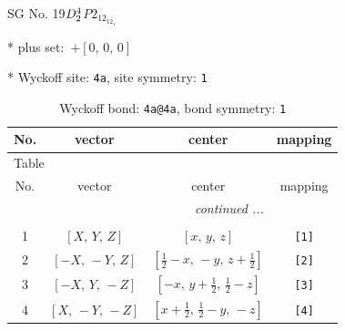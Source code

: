 \documentclass[fleqn,8pt]{jsarticle}
\begin{document}
\setcounter{MaxMatrixCols}{32}

\renewcommand{\tablename}{Table~}
\renewcommand{\figurename}{Figure~}
\begin{center}
\LARGE
SG No. 19\quad$D_{\rm 2}^{4}$\quad$P2_12_12_1$\quad[ orthorhombic ]
\end{center}

* plus set:\,\,\,$+\left[ 0,\, 0,\, 0 \right]$


* Wyckoff site: {\tt 4a}, site symmetry: {\tt 1}
\renewcommand{\arraystretch}{1.2}
\begin{longtable}{cccc}
\caption{Wyckoff bond: {\tt 4a@4a}, bond symmetry: {\tt 1}}
 \\
 \hline \hline
No. & vector & center & mapping \\ \hline \endfirsthead

\multicolumn{3}{l}{\tablename\ \thetable{}} \\
 \hline \hline
No. & vector & center & mapping \\ \hline \endhead

 \hline \hline
\multicolumn{3}{r}{\footnotesize\it continued ...} \\ \endfoot

 \hline \hline
\multicolumn{3}{r}{} \\ \endlastfoot

1 & $\left[ X,\, Y,\, Z \right]$ & $\left[ x,\, y,\, z \right]$ & {\tt [1]} \\ \hline
2 & $\left[ - X,\, - Y,\, Z \right]$ & $\left[ \frac{1}{2} - x,\, - y,\, z + \frac{1}{2} \right]$ & {\tt [2]} \\ \hline
3 & $\left[ - X,\, Y,\, - Z \right]$ & $\left[ - x,\, y + \frac{1}{2},\, \frac{1}{2} - z \right]$ & {\tt [3]} \\ \hline
4 & $\left[ X,\, - Y,\, - Z \right]$ & $\left[ x + \frac{1}{2},\, \frac{1}{2} - y,\, - z \right]$ & {\tt [4]} \\
\end{longtable}
\end{document}
